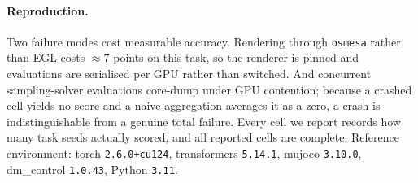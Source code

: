 \paragraph{Reproduction.}
Two failure modes cost measurable accuracy. Rendering through \texttt{osmesa}
rather than EGL costs ${\approx}7$ points on this task, so the renderer is
pinned and evaluations are serialised per GPU rather than switched. And
concurrent sampling-solver evaluations core-dump under GPU contention; because a
crashed cell yields no score and a naive aggregation averages it as a zero, a
crash is indistinguishable from a genuine total failure. Every cell we report
records how many task seeds actually scored, and all reported cells are
complete. Reference environment: torch \texttt{2.6.0+cu124}, transformers
\texttt{5.14.1}, mujoco \texttt{3.10.0}, dm\_control \texttt{1.0.43},
Python \texttt{3.11}.
